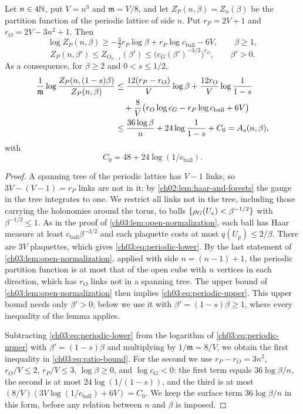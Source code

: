 \begin{lemma}\label{ch03:lem:partition-ratio}
Let $n\in4\mathbb N$, put $V=n^3$ and $\mathfrak m=V/8$, and let $Z_P(n,\beta)=Z_n(\beta)$ be the partition function of the periodic lattice of side $n$. Put $r_P=2V+1$ and $r_O=2V-3n^2+1$. Then
\begin{equation}\label{ch03:eq:periodic-lower}
 \log Z_P(n,\beta)\ge-\tfrac32r_P\log\beta+r_P\log c_{\mathrm{ball}}-6V,\qquad\beta\ge1,
\end{equation}
\begin{equation}\label{ch03:eq:periodic-upper}
 Z_P(n,\beta')\le Z_{O_{n-1}}(\beta')\le\bigl(c_G(\beta')^{-3/2}\bigr)^{r_O},\qquad\beta'>0.
\end{equation}
As a consequence, for $\beta\ge2$ and $0<s\le1/2$,
\begin{align}
 \frac1{\mathfrak m}\log\frac{Z_P(n,(1-s)\beta)}{Z_P(n,\beta)}
 &\le\frac{12(r_P-r_O)}V\log\beta+\frac{12r_O}V\log\frac1{1-s}\notag\\
 &\quad+\frac8V\bigl(r_O\log c_G-r_P\log c_{\mathrm{ball}}+6V\bigr)\label{ch03:eq:ratio-bound}\\
 &\le\frac{36\log\beta}n+24\log\frac1{1-s}+C_0=A_s(n,\beta),\notag
\end{align}
with
\begin{equation}\label{ch03:eq:C0-choice}
 C_0=48+24\log(1/c_{\mathrm{ball}}).
\end{equation}
\end{lemma}

\begin{proof}
A spanning tree of the periodic lattice has $V-1$ links, so $3V-(V-1)=r_P$ links are not in it; by \cref{ch02:lem:haar-and-forests} the gauge in the tree integrates to one. We restrict all links not in the tree, including those carrying the holonomies around the torus, to balls $\{\rho_G(U_e)<\beta^{-1/2}\}$ with $\beta^{-1/2}\le1$. As in the proof of \cref{ch03:lem:open-normalization}, each ball has Haar measure at least $c_{\mathrm{ball}}\beta^{-3/2}$ and each plaquette costs at most $q(U_p)\le2/\beta$. There are $3V$ plaquettes, which gives \eqref{ch03:eq:periodic-lower}. By the last statement of \cref{ch03:lem:open-normalization}, applied with side $n=(n-1)+1$, the periodic partition function is at most that of the open cube with $n$ vertices in each direction, which has $r_O$ links not in a spanning tree. The upper bound of \cref{ch03:lem:open-normalization} then implies \eqref{ch03:eq:periodic-upper}. This upper bound needs only $\beta'>0$; below we use it with $\beta'=(1-s)\beta\ge1$, where every inequality of the lemma applies.

Subtracting \eqref{ch03:eq:periodic-lower} from the logarithm of \eqref{ch03:eq:periodic-upper} with $\beta'=(1-s)\beta$ and multiplying by $1/\mathfrak m=8/V$, we obtain the first inequality in \eqref{ch03:eq:ratio-bound}. For the second we use $r_P-r_O=3n^2$, $r_O/V\le2$, $r_P/V\le3$, $\log\beta\ge0$, and $\log c_G<0$: the first term equals $36\log\beta/n$, the second is at most $24\log(1/(1-s))$, and the third is at most $(8/V)(3V\log(1/c_{\mathrm{ball}})+6V)=C_0$. We keep the surface term $36\log\beta/n$ in this form, before any relation between $n$ and $\beta$ is imposed.
\end{proof}


